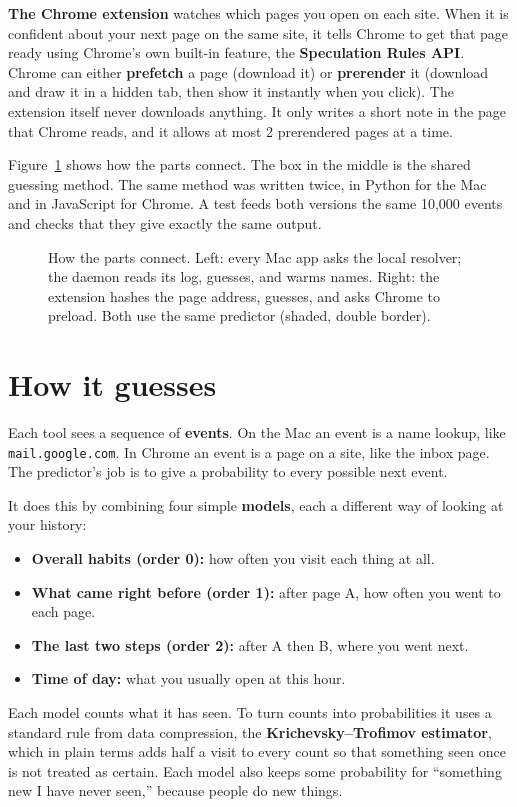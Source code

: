 \documentclass[11pt]{article}
\newcommand{\term}[1]{\textbf{#1}}
\begin{document}
\textbf{The Chrome extension} watches which pages you open on each site. When it is confident about your next page on the same site, it tells Chrome to get that page ready using Chrome's own built-in feature, the \term{Speculation Rules API}. Chrome can either \term{prefetch} a page (download it) or \term{prerender} it (download and draw it in a hidden tab, then show it instantly when you click). The extension itself never downloads anything. It only writes a short note in the page that Chrome reads, and it allows at most 2 prerendered pages at a time.

Figure~\ref{fig:system} shows how the parts connect. The box in the middle is the shared guessing method. The same method was written twice, in Python for the Mac and in JavaScript for Chrome. A test feeds both versions the same 10{,}000 events and checks that they give exactly the same output.

\begin{figure}[h]
\centering
\resizebox{\textwidth}{!}{\systemdiagram}
\caption{How the parts connect. Left: every Mac app asks the local resolver; the daemon reads its log, guesses, and warms names. Right: the extension hashes the page address, guesses, and asks Chrome to preload. Both use the same predictor (shaded, double border).}
\label{fig:system}
\end{figure}

\section{How it guesses}
Each tool sees a sequence of \term{events}. On the Mac an event is a name lookup, like \texttt{mail.google.com}. In Chrome an event is a page on a site, like the inbox page. The predictor's job is to give a probability to every possible next event.

It does this by combining four simple \term{models}, each a different way of looking at your history:
\begin{itemize}
\item \textbf{Overall habits (order 0):} how often you visit each thing at all.
\item \textbf{What came right before (order 1):} after page A, how often you went to each page.
\item \textbf{The last two steps (order 2):} after A then B, where you went next.
\item \textbf{Time of day:} what you usually open at this hour.
\end{itemize}
Each model counts what it has seen. To turn counts into probabilities it uses a standard rule from data compression, the \term{Krichevsky--Trofimov estimator}, which in plain terms adds half a visit to every count so that something seen once is not treated as certain. Each model also keeps some probability for ``something new I have never seen,'' because people do new things.
\end{document}
